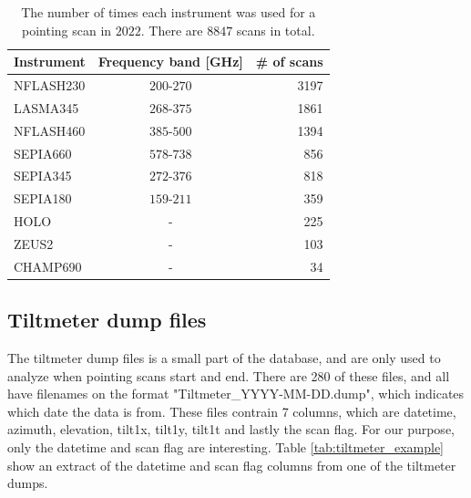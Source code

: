\begin{table}[H]
    \centering
    \caption{The number of times each instrument was used for a pointing scan in $2022$. There are $8847$ scans in total.}
    \begin{tabular}{lcr}
        \toprule
        Instrument & Frequency band [GHz] &\# of scans \\
        \midrule
        NFLASH230 & $200$-$270$ &3197 \\
        LASMA345  & $268$-$375$ &1861 \\
        NFLASH460 & $385$-$500$ &1394 \\
        SEPIA660  & $578$-$738$ & 856 \\
        SEPIA345  & $272$-$376$ & 818 \\
        SEPIA180  & $159$-$211$ & 359 \\
        HOLO      & - & 225 \\
        ZEUS2     & - & 103 \\
        CHAMP690  & - &  34 \\
        \bottomrule
        \end{tabular}
        \label{tab:instrument_usage}
\end{table}



\subsection{Tiltmeter dump files}
The tiltmeter dump files is a small part of the database, and are only used to analyze when pointing scans start and end.
There are 280 of these files, and all have filenames on the format "Tiltmeter\_YYYY-MM-DD.dump", which indicates which date the data is from.
These files contrain 7 columns, which are datetime, azimuth, elevation, tilt1x, tilt1y, tilt1t and lastly the scan flag.
For our purpose, only the datetime and scan flag are interesting.
Table \ref{tab:tiltmeter_example} show an extract of the datetime and scan flag columns from one of the tiltmeter dumps.

